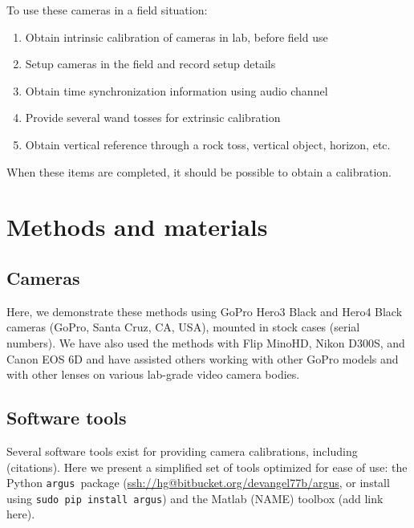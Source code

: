 \documentclass[fleqn,10pt]{wlpeerj}
\makeatletter
\newcommand{\argus}{\texttt{argus}}
\newcommand{\pipcommand}{\texttt{sudo pip install argus}}
\newcommand{\argusrepo}{\url{ssh://hg@bitbucket.org/devangel77b/argus}}
\newcommand{\matlabtoolbox}{add link here}
\makeatother
\begin{document}
To use these cameras in a field situation:
\begin{enumerate}
\item{Obtain intrinsic calibration of cameras in lab, before field use}
\item{Setup cameras in the field and record setup details}
\item{Obtain time synchronization information using audio channel}
\item{Provide several wand tosses for extrinsic calibration}
\item{Obtain vertical reference through a rock toss, vertical object, horizon, etc.}
\end{enumerate}

When these items are completed, it should be possible to obtain a calibration.  

\section*{Methods and materials}
\subsection*{Cameras}
Here, we demonstrate these methods using GoPro Hero3 Black and Hero4 Black cameras (GoPro, Santa Cruz, CA, USA), mounted in stock cases (serial numbers).  We have also used the methods with Flip MinoHD, Nikon D300S, and Canon EOS 6D and have assisted others working with other GoPro models and with other lenses on various lab-grade video camera bodies.

\subsection*{Software tools}
Several software tools exist for providing camera calibrations, including (citations).  Here we present a simplified set of tools optimized for ease of use: the Python \argus\ package (\argusrepo, or install using \pipcommand) and the Matlab (NAME) toolbox (\matlabtoolbox). %
\end{document}
